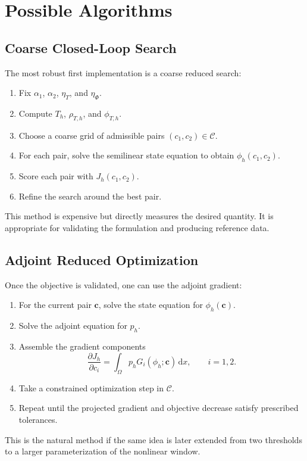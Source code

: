 \documentclass[11pt]{article}
\newcommand{\dd}{\,\mathrm d}
\newcommand{\OmegaD}{\Omega}
\newcommand{\cvec}{\bm c}
\begin{document}
\section{Possible Algorithms}

\subsection{Coarse Closed-Loop Search}

The most robust first implementation is a coarse reduced search:
\begin{enumerate}[label=\arabic*.]
  \item Fix \(\alpha_1\), \(\alpha_2\), \(\eta_T\), and \(\eta_\Phi\).
  \item Compute \(T_h\), \(\rho_{T,h}\), and \(\phi_{T,h}\).
  \item Choose a coarse grid of admissible pairs \((c_1,c_2)\in\mathcal C\).
  \item For each pair, solve the semilinear state equation to obtain
  \(\phi_h(c_1,c_2)\).
  \item Score each pair with \(J_h(c_1,c_2)\).
  \item Refine the search around the best pair.
\end{enumerate}
This method is expensive but directly measures the desired quantity.  It is
appropriate for validating the formulation and producing reference data.

\subsection{Adjoint Reduced Optimization}

Once the objective is validated, one can use the adjoint gradient:
\begin{enumerate}[label=\arabic*.]
  \item For the current pair \(\cvec\), solve the state equation for
  \(\phi_h(\cvec)\).
  \item Solve the adjoint equation for \(p_h\).
  \item Assemble the gradient components
  \[
    \frac{\partial J_h}{\partial c_i}
    =
    \int_{\OmegaD}p_hG_i(\phi_h;\cvec)\dd x,
    \qquad i=1,2.
  \]
  \item Take a constrained optimization step in \(\mathcal C\).
  \item Repeat until the projected gradient and objective decrease satisfy
  prescribed tolerances.
\end{enumerate}
This is the natural method if the same idea is later extended from two
thresholds to a larger parameterization of the nonlinear window.
\end{document}
